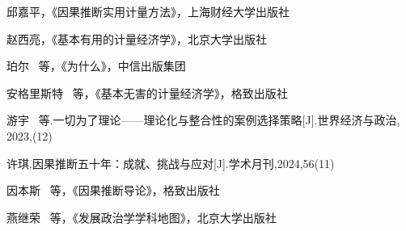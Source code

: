 \newpage
\thispagestyle{empty}
\begin{thebibliography}{99}
	邱嘉平，《因果推断实用计量方法》，上海财经大学出版社

	赵西亮，《基本有用的计量经济学》，北京大学出版社

	珀尔 \ 等，《为什么》，中信出版集团

	安格里斯特 \ 等，《基本无害的计量经济学》，格致出版社

	游宇 \ 等.一切为了理论——理论化与整合性的案例选择策略[J].世界经济与政治, \\ 2023,(12)

	许琪.因果推断五十年：成就、挑战与应对[J].学术月刊,2024,56(11)

	因本斯 \ 等，《因果推断导论》，格致出版社

	燕继荣 \ 等，《发展政治学学科地图》，北京大学出版社

\end{thebibliography}